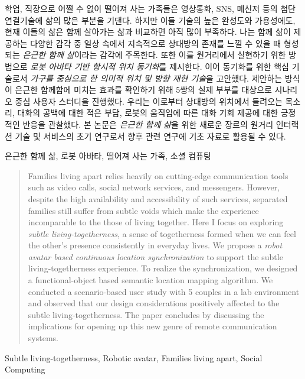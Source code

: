 
\begin{summary}      
학업, 직장으로 어쩔 수 없이 떨어져 사는 가족들은 영상통화, SNS, 메신저 등의 첨단 연결기술에 삶의 많은 부분을 기댄다. 하지만 이들 기술의 높은 완성도와 가용성에도, 현재 이들의 삶은 함께 살아가는 삶과 비교하면 아직 많이 부족하다. 나는 함께 삶이 제공하는 다양한 감각 중 일상 속에서 지속적으로 상대방의 존재를 느낄 수 있을 때 형성되는 \emph{은근한 함께 삶}이라는 감각에 주목한다. 또한 이를 원거리에서 실현하기 위한 방법으로 \emph{로봇 아바타 기반 항시적 위치 동기화}를 제시한다. 이어 동기화를 위한 핵심 기술로서 \emph{가구를 중심으로 한 의미적 위치 및 방향 재현 기술}을 고안했다. 제안하는 방식이 은근한 함께함에 미치는 효과를 확인하기 위해 5쌍의 실제 부부를 대상으로 시나리오 중심 사용자 스터디을 진행했다. 우리는 이로부터 상대방의 위치에서 들려오는 목소리, 대화의 공백에 대한 적은 부담, 로봇의 움직임에 따른 대화 기회 제공에 대한 긍정적인 반응을 관찰했다. 본 논문은 \emph{은근한 함께 삶}을 위한 새로운 장르의 원거리 인터랙션 기술 및 서비스의 초기 연구로서 향후 관련 연구에 기초 자료로 활용될 수 있다.
\end{summary}

\begin{Korkeyword}
은근한 함께 삶, 로봇 아바타, 떨어져 사는 가족, 소셜 컴퓨팅
\end{Korkeyword}


\begin{abstract}
Families living apart relies heavily on cutting-edge communication tools such as video calls, social network services, and messengers. However, despite the high availability and accessibility of such services, separated families still suffer from subtle voids which make the experience incomparable to the those of living together. Here I focus on exploring \emph{subtle living-togetherness}, a sense of togetherness formed when we can feel the other's presence consistently in everyday lives. We propose a \emph{robot avatar based continuous location synchronization} to support the subtle living-togetherness experience. To realize the synchronization, we designed a functional-object based semantic location mapping algorithm. We conducted a scenario-based user study with 5 couples in a lab environment and observed that our design considerations positively affected to the subtle living-togetherness. The paper concludes by discussing the implications for opening up this new genre of remote communication systems.
\end{abstract}
 
\begin{Engkeyword}
Subtle living-togetherness, Robotic avatar, Families living apart, Social Computing
\end{Engkeyword}

